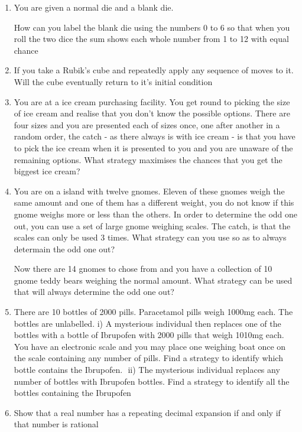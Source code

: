 \documentclass[a4paper]{article}
\begin{document}
\begin{enumerate}
	\item
	You are given a normal die and a blank die.

	How can you label the blank die using the numbers 0 to 6 so that when you roll the two dice the sum shows each whole number from 1 to 12 with equal chance
    
    \item
    If you take a Rubik's cube and repeatedly apply any sequence of moves to it. Will the cube eventually return to it's initial condition
    
    \item
    You are at a ice cream purchasing facility. You get round to picking the size of ice cream and realise that you don't know the possible options. There are four sizes and you are presented each of sizes once, one after another in a random order, the catch - as there always is with ice cream - is that you have to pick the ice cream when it is presented to you and you are unaware of the remaining options. What strategy maximises the chances that you get the biggest ice cream?

	\item
    You are on a island with twelve gnomes. Eleven of these gnomes weigh the same amount and one of them has a different weight, you do not know if this gnome weighs more or less than the others. In order to determine the odd one out, you can use a set of large gnome weighing scales. The catch, is that the scales can only be used 3 times. What strategy can you use so as to always determain the odd one out?

    Now there are 14 gnomes to chose from and you have a collection of 10 gnome teddy bears weighing the normal amount. What strategy can be used that will always determine the odd one out?
    
    \item
    There are 10 bottles of 2000 pills. Paracetamol pills weigh 1000mg each. The bottles are unlabelled.
    i) A mysterious individual then replaces one of the bottles with a bottle of Ibrupofen with 2000 pills that weigh 1010mg each. You have an electronic scale and you may place one weighing boat once on the scale containing any number of pills. Find a strategy to identify which bottle contains the Ibrupofen. 
    ii) The mysterious individual replaces any number of bottles with Ibrupofen bottles. Find a strategy to identify all the bottles containing the Ibrupofen
    
	\item
	Show that a real number has a repeating decimal expansion if and only if that number is rational
	

\end{enumerate}
\end{document}
